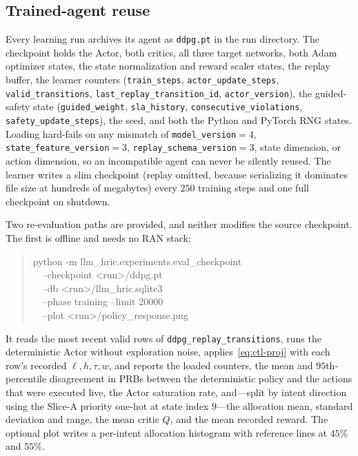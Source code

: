 \subsection{Trained-agent reuse}
\label{subsec:ctl-reuse}
Every learning run archives its agent as \texttt{ddpg.pt} in the run directory. The checkpoint holds the Actor, both critics, all three target networks, both Adam optimizer states, the state normalization and reward scaler states, the replay buffer, the learner counters (\texttt{train\_steps}, \texttt{actor\_update\_steps}, \texttt{valid\_transitions}, \texttt{last\_replay\_transition\_id}, \texttt{actor\_version}), the guided-safety state (\texttt{guided\_weight}, \texttt{sla\_history}, \texttt{consecutive\_violations}, \texttt{safety\_update\_steps}), the seed, and both the Python and PyTorch RNG states. Loading hard-fails on any mismatch of \texttt{model\_version}${}=4$, \texttt{state\_feature\_version}${}=3$, \texttt{replay\_schema\_version}${}=3$, state dimension, or action dimension, so an incompatible agent can never be silently reused. The learner writes a slim checkpoint (replay omitted, because serializing it dominates file size at hundreds of megabytes) every $250$ training steps and one full checkpoint on shutdown.

Two re-evaluation paths are provided, and neither modifies the source checkpoint. The first is offline and needs no RAN stack:
\begin{quote}\footnotesize\ttfamily
python -m llm\_hric.experiments.eval\_checkpoint\\
\ \ --checkpoint <run>/ddpg.pt\\
\ \ --db <run>/llm\_hric.sqlite3\\
\ \ --phase training --limit 20000\\
\ \ --plot <run>/policy\_response.png
\end{quote}
It reads the most recent valid rows of \texttt{ddpg\_replay\_transitions}, runs the deterministic Actor without exploration noise, applies~\eqref{eq:ctl-proj} with each row's recorded $\ell,h,\tau,w$, and reports the loaded counters, the mean and $95$th-percentile disagreement in PRBs between the deterministic policy and the actions that were executed live, the Actor saturation rate, and---split by intent direction using the Slice-A priority one-hot at state index $9$---the allocation mean, standard deviation and range, the mean critic $Q$, and the mean recorded reward. The optional plot writes a per-intent allocation histogram with reference lines at $45\%$ and $55\%$.

